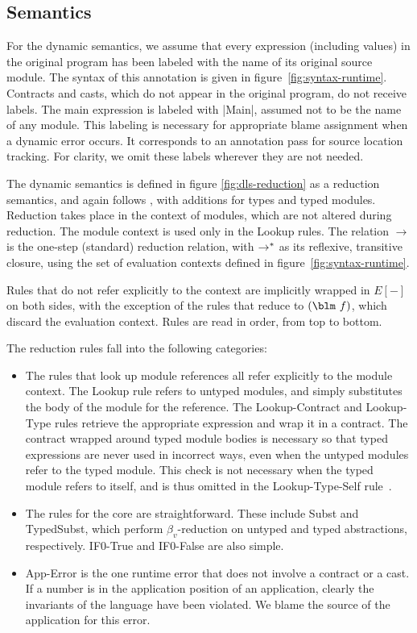 \begin{schemeregion}
\subsection{Semantics}

For the dynamic semantics, we assume that every expression (including
values) in the original program has been labeled with the name of its
original source module. The syntax of this annotation is given in
figure~\ref{fig:syntax-runtime}. 
 Contracts and casts, which do not appear in the
original program, do not receive labels.  The main expression is
labeled with \scheme|Main|, assumed not to be the name of any module.
  This labeling is necessary for appropriate
blame assignment when a dynamic error occurs. It corresponds to an
annotation pass for source location tracking.  For clarity, we omit
these labels wherever they are not needed.

The dynamic semantics is defined in figure \ref{fig:dls-reduction} as a
reduction semantics, and
again follows \citet{mff:popl06}, with additions for types and
typed modules.
  Reduction takes place in the context of modules, which are
not altered during reduction.  The module context is used only in the
{\sc Lookup} rules.  The relation $\rightarrow$ is the
one-step (standard) reduction relation, with $\rightarrow^*$ as its reflexive,
transitive closure, using the set of evaluation contexts defined in
figure~\ref{fig:syntax-runtime}.  


Rules that do not refer explicitly to the context are implicitly wrapped in
$E[-]$ on both sides, with the exception of the rules that reduce to
$\blame{f}$, which discard the evaluation context.  Rules are read in
order, from top to bottom.  

The reduction rules fall into the following categories:

\begin{itemize}
\item The rules that look up module references all refer explicitly to
  the module context. The {\sc Lookup} rule refers to untyped
  modules, and simply substitutes the body of the module for the
  reference.  The {\sc Lookup-Contract} and {\sc Lookup-Type} rules
  retrieve the appropriate expression and wrap it in a contract.  The
  contract wrapped around typed module bodies is necessary so that typed
  expressions are never used in incorrect ways, even when the untyped
  modules refer to the typed module.  This check is not necessary when
  the typed module refers to itself, and is thus omitted in the {\sc
    Lookup-Type-Self} rule~\cite{ff:ho-contracts}.
\item
  The rules for the core are straightforward.
  These include {\sc Subst} and {\sc TypedSubst}, which perform
  $\beta_v$-reduction on untyped and typed abstractions, respectively.  
  {\sc IF0-True} and {\sc IF0-False} are also simple.
\item
  {\sc App-Error} is the one runtime error that does not involve a
  contract or a cast.  If a number is in the application position of
  an application, clearly the invariants of the language have been
  violated.  We blame the source of the application for this error.


\end{itemize}
\end{schemeregion}
